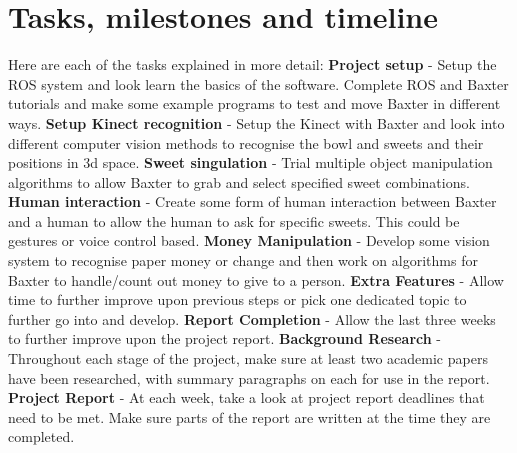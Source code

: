 \section{Tasks, milestones and timeline}
Here are each of the tasks explained in more detail:
\newline
\newline
\textbf{Project setup} - Setup the ROS system and look learn the basics of the software. Complete ROS and Baxter tutorials and make some example programs to test and move Baxter in different ways.
\newline
\newline
\textbf{Setup Kinect recognition} - Setup the Kinect with Baxter and look into different computer vision methods to recognise the bowl and sweets and their positions in 3d space.
\newline
\newline
\textbf{Sweet singulation} - Trial multiple object manipulation algorithms to allow Baxter to grab and select specified sweet combinations.
\newline
\newline
\textbf{Human interaction} - Create some form of human interaction between Baxter and a human to allow the human to ask for specific sweets. This could be gestures or voice control based.
\newline
\newline
\textbf{Money Manipulation} - Develop some vision system to recognise paper money or change and then work on algorithms for Baxter to handle/count out money to give to a person.
\newline
\newline
\textbf{Extra Features} - Allow time to further improve upon previous steps or pick one dedicated topic to further go into and develop.
\newline
\newline
\textbf{Report Completion} - Allow the last three weeks to further improve upon the project report.
\newline
\newline
\textbf{Background Research} - Throughout each stage of the project, make sure at least two academic papers have been researched, with summary paragraphs on each for use in the report.
\newline
\newline
\textbf{Project Report} - At each week, take a look at project report deadlines that need to be met. Make sure parts of the report are written at the time they are completed.
